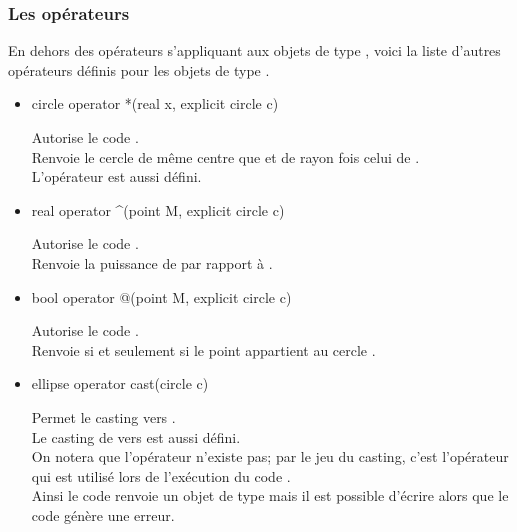 \documentclass[pdftex]{article}
\newcommand{\ssi}{si et seulement si\xspace}
\begin{document}
\subsubsection{Les opérateurs}
En dehors des opérateurs s'appliquant aux objets de type ,
voici la liste d'autres opérateurs définis pour les objets de type .
\begin{itemize}
\item {}%
    \begin{Vcolor}
    circle operator *(real x, explicit circle c)
  \end{Vcolor}
  Autorise le code .\\
  Renvoie le cercle de même centre que  et de rayon 
  fois celui de .\\
  L'opérateur  est
  aussi défini.
\item {}%
    \begin{Vcolor}
    real operator ^(point M, explicit circle c)
  \end{Vcolor}
  Autorise le code .\\
  Renvoie la puissance de  par rapport à .
\item {}%
    \begin{Vcolor}
    bool operator @(point M, explicit circle c)
  \end{Vcolor}
  Autorise le code .\\
  Renvoie  \ssi le point  appartient au cercle .
\item {}%
    \begin{Vcolor}
    ellipse operator cast(circle c)
  \end{Vcolor}
  Permet le \og{}casting\fg{}  vers .\\
  Le \og{}casting\fg{} de  vers  est aussi
  défini.\\
  On notera que l'opérateur  n'existe pas;
  par le jeu du \og{}casting\fg{}, c'est l'opérateur
   qui est utilisé
  lors de l'exécution du code .\\
  Ainsi le code  renvoie un objet de type
   mais il est possible d'écrire
   alors que le code
   génère une erreur.
\end{itemize}
\end{document}
